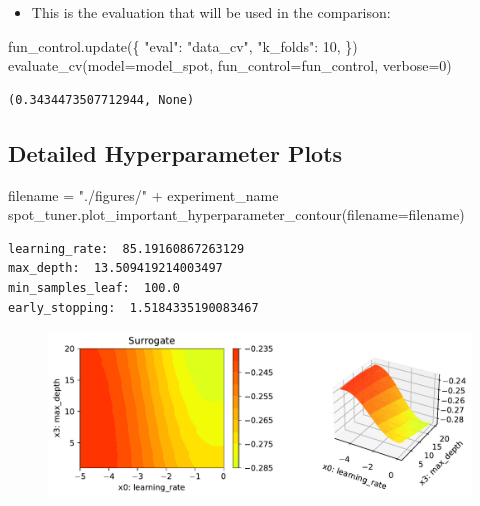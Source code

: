 \documentclass[
  letterpaper,
  DIV=11,
  numbers=noendperiod]{scrreprt}
\newenvironment{Shaded}{\begin{snugshade}}{\end{snugshade}}
\newcommand{\DecValTok}[1]{\textcolor[rgb]{0.68,0.00,0.00}{#1}}
\newcommand{\NormalTok}[1]{\textcolor[rgb]{0.00,0.23,0.31}{#1}}
\newcommand{\OperatorTok}[1]{\textcolor[rgb]{0.37,0.37,0.37}{#1}}
\newcommand{\StringTok}[1]{\textcolor[rgb]{0.13,0.47,0.30}{#1}}
\providecommand{\tightlist}{%
  \setlength{\itemsep}{0pt}\setlength{\parskip}{0pt}}\usepackage{longtable,booktabs,array}
\begin{document}
\begin{itemize}
\tightlist
\item
  This is the evaluation that will be used in the comparison:
\end{itemize}

\begin{Shaded}
\begin{Highlighting}[]
\NormalTok{fun\_control.update(\{}
     \StringTok{"eval"}\NormalTok{: }\StringTok{"data\_cv"}\NormalTok{,}
     \StringTok{"k\_folds"}\NormalTok{: }\DecValTok{10}\NormalTok{,}
\NormalTok{\})}
\NormalTok{evaluate\_cv(model}\OperatorTok{=}\NormalTok{model\_spot, fun\_control}\OperatorTok{=}\NormalTok{fun\_control, verbose}\OperatorTok{=}\DecValTok{0}\NormalTok{)}
\end{Highlighting}
\end{Shaded}

\begin{verbatim}
(0.3434473507712944, None)
\end{verbatim}

\hypertarget{detailed-hyperparameter-plots-4}{%
\subsection{Detailed Hyperparameter
Plots}\label{detailed-hyperparameter-plots-4}}

\begin{Shaded}
\begin{Highlighting}[]
\NormalTok{filename }\OperatorTok{=} \StringTok{"./figures/"} \OperatorTok{+}\NormalTok{ experiment\_name}
\NormalTok{spot\_tuner.plot\_important\_hyperparameter\_contour(filename}\OperatorTok{=}\NormalTok{filename)}
\end{Highlighting}
\end{Shaded}

\begin{verbatim}
learning_rate:  85.19160867263129
max_depth:  13.509419214003497
min_samples_leaf:  100.0
early_stopping:  1.5184335190083467
\end{verbatim}

\begin{figure}[H]

{\centering \includegraphics{17_spot_hpt_sklearn_multiclass_classification_xgb_files/figure-pdf/cell-47-output-2.pdf}

}

\end{figure}
\end{document}
